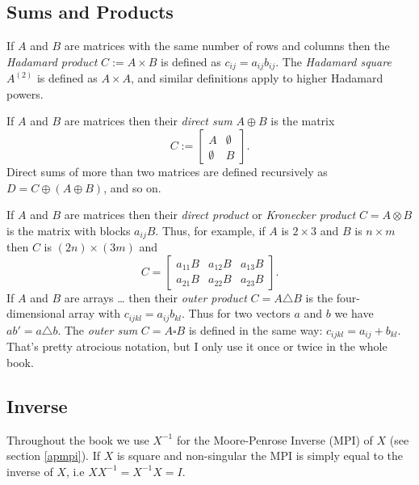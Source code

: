\documentclass[
  12pt,
]{book}
\theoremstyle{definition}
\theoremstyle{definition}
\theoremstyle{definition}
\theoremstyle{definition}
\theoremstyle{remark}
\begin{document}
\hypertarget{apcombo}{%
\subsection{Sums and Products}\label{apcombo}}

If \(A\) and \(B\) are matrices with the same number of rows and columns
then the \emph{Hadamard product} \(C:=A\times B\) is defined as \(c_{ij}=a_{ij}b_{ij}\).
The \emph{Hadamard square} \(A^{(2)}\) is defined as \(A\times A\), and similar definitions apply to higher Hadamard powers.

If \(A\) and \(B\) are matrices then their \emph{direct sum} \(A\oplus B\) is the matrix
\begin{equation}
C:=\begin{bmatrix}A&\emptyset\\\emptyset&B\end{bmatrix}.
\label{eq:dirsum}
\end{equation}
Direct sums of more than two matrices are defined recursively as
\(D=C\oplus(A\oplus B)\), and so on.

If \(A\) and \(B\) are matrices then their \emph{direct product} or \emph{Kronecker product} \(C=A\otimes B\) is the matrix with blocks \(a_{ij}B\). Thus, for example, if \(A\) is \(2\times 3\) and \(B\) is \(n\times m\) then \(C\) is \((2n)\times (3m)\) and
\begin{equation}
C=\begin{bmatrix}a_{11}B&a_{12}B&a_{13}B\\a_{21}B&a_{22}B&a_{23}B\end{bmatrix}.
\label{eq:dirprod}
\end{equation}
If \(A\) and \(B\) are arrays \ldots{} then their \emph{outer product} \(C=A\triangle B\) is the four-dimensional array with \(c_{ijkl}=a_{ij}b_{kl}\). Thus for two vectors \(a\) and \(b\) we have \(ab'=a\triangle b\). The \emph{outer sum} \(C=A\square B\) is defined in the same way: \(c_{ijkl}=a_{ij}+b_{kl}\).
That's pretty atrocious notation, but I only use it once or twice in the whole book.

\hypertarget{apinverse}{%
\subsection{Inverse}\label{apinverse}}

Throughout the book we use \(X^{-1}\) for the Moore-Penrose Inverse (MPI) of \(X\) (see section \ref{apmpi}). If \(X\) is square and non-singular the MPI is simply equal to the inverse of \(X\), i.e \(XX^{-1}=X^{-1}X=I\).
\end{document}

